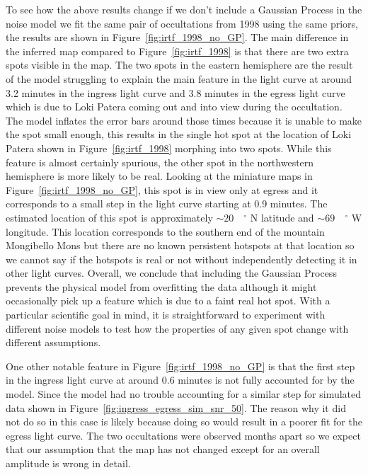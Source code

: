 \documentclass[12pt,dvipsnames]{report}
\begin{document}
To see how the above results change if we don't include a Gaussian Process in the noise model we fit the same pair of occultations from 1998 using the same priors, the results are shown in Figure~\ref{fig:irtf_1998_no_GP}.
The main difference in the inferred map compared to Figure~\ref{fig:irtf_1998} is that there are two extra spots visible in the map.
The two spots in the eastern hemisphere are the result of the model struggling to explain the main feature in the light curve at around 3.2 minutes in the ingress light curve and 3.8 minutes in the egress light curve which is due to  Loki Patera coming out and into view during the occultation.
The model inflates the error bars around those times because it is unable to make the spot small enough, this results in the single hot spot at the location of Loki Patera shown in Figure~\ref{fig:irtf_1998} morphing into two spots.
While this feature is almost certainly spurious, the other spot in the northwestern hemisphere is more likely to be real.
Looking at the miniature maps in Figure~\ref{fig:irtf_1998_no_GP}, this spot is in view only at egress and it corresponds to a small step in the light curve starting at 0.9 minutes.
The estimated location of this spot is approximately $\sim 20\quad^\circ$ N latitude and $\sim 69\quad^\circ$ W longitude.
This location corresponds to the southern end of the mountain Mongibello Mons but there are no known persistent hotspots at that location so we cannot say if the hotspots is real or not without independently detecting it in other light curves.
Overall, we conclude that including the Gaussian Process prevents the physical model from overfitting the data although it might occasionally pick up a feature which is due to a faint real hot spot.
With a particular scientific goal in mind, it is straightforward to experiment with different noise models to test how the properties of any given spot change with different assumptions.

One other notable feature in Figure~\ref{fig:irtf_1998_no_GP} is that the first step in the ingress light curve at around 0.6 minutes is not fully accounted for by the model.
Since the model had no trouble accounting for a similar step for simulated data shown in Figure~\ref{fig:ingress_egress_sim_snr_50}. 
The reason why it did not do so in this case is likely because doing so would result in a poorer fit for the egress light curve.
The two occultations were observed months apart so we expect that our assumption that the map has not changed except for an overall amplitude is wrong in detail.  
\end{document}
